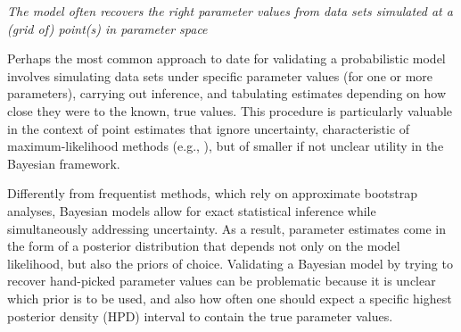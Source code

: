 \documentclass[oneside]{article}
\begin{document}





\vspace{.5cm}
\noindent \emph{The model often recovers the right parameter values
  from data sets simulated at a (grid of) point(s) in parameter space}

Perhaps the most common approach to date for validating a
probabilistic model involves simulating data sets under specific parameter
values (for one or more parameters), carrying out inference, and tabulating
estimates depending on how close they were to the known, true values.
This procedure is particularly valuable in the context of point estimates
that ignore uncertainty, characteristic of maximum-likelihood methods (e.g.,
\citealp{mccormack09,han13,mendes17}), but of smaller if not unclear
utility in the Bayesian framework.

Differently from frequentist methods, which rely on approximate bootstrap
analyses, Bayesian models allow for exact statistical inference while
simultaneously addressing uncertainty.
As a result, parameter estimates come in the form of a posterior
distribution that depends not only on the model likelihood, but
also the priors of choice.
Validating a Bayesian model by trying to recover
hand-picked parameter values can be problematic because it is unclear
which prior is to be used, and also how often one should
expect a specific highest posterior density (HPD) interval to contain
the true parameter values.
\end{document}

